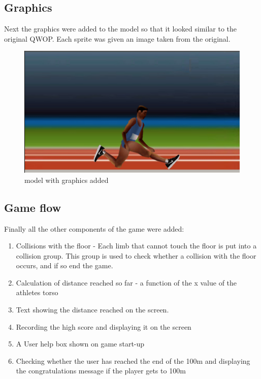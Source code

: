 \documentclass[12pt,a4paper,twoside,openright]{report}
\begin{document}
\subsection{Graphics}
\label{sec:graphics}
Next the graphics were added to the model so that it looked similar to the original QWOP.
Each sprite was given an image taken from the original.

\begin{figure}[tbh]
\centerline{\includegraphics[scale=0.4]{Images/modelWithGraphics.PNG}}
\caption{model with graphics added}
\label{modelWithGraphics}
\end{figure}

\subsection{Game flow}
\label{sec:gameFlow}
Finally all the other components of the game were added:

\begin{enumerate}
	\item Collisions with the floor - Each limb that cannot touch the floor is put into a collision group. This group is used to check whether a collision with the floor occurs, and if so end the game.
	\item Calculation of distance reached so far - a function of the x value of the athletes torso
	\item Text showing the distance reached on the screen.
	\item Recording the high score and displaying it on the screen
	\item A User help box shown on game start-up
	\item Checking whether the user has reached the end of the 100m and displaying the congratulations message if the player gets to 100m
\end{enumerate}
\end{document}
